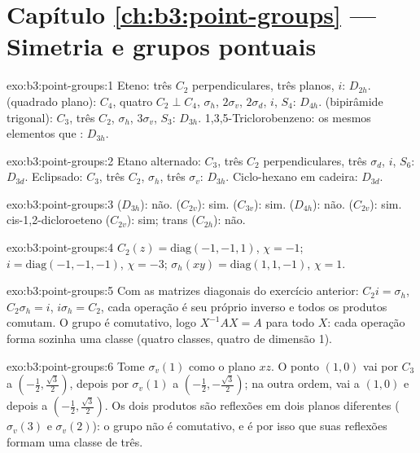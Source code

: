 \section*{Capítulo \ref{ch:b3:point-groups} --- Simetria e grupos pontuais}

\begin{solution}{exo:b3:point-groups:1}
Eteno: três $C_2$ perpendiculares, três planos, $i$: $D_{2h}$.  (quadrado
plano): $C_4$, quatro $C_2 \perp C_4$, $\sigma_h$, $2\sigma_v$, $2\sigma_d$, $i$, $S_4$:
$D_{4h}$.  (bipirâmide trigonal): $C_3$, três $C_2$, $\sigma_h$, $3\sigma_v$,
$S_3$: $D_{3h}$. 1,3,5-Triclorobenzeno: os mesmos elementos que : $D_{3h}$.
\end{solution}

\begin{solution}{exo:b3:point-groups:2}
Etano alternado: $C_3$, três $C_2$ perpendiculares, três $\sigma_d$, $i$, $S_6$:
$D_{3d}$. Eclipsado: $C_3$, três $C_2$, $\sigma_h$, três $\sigma_v$: $D_{3h}$.
Ciclo-hexano em cadeira: $D_{3d}$.
\end{solution}

\begin{solution}{exo:b3:point-groups:3}
 ($D_{3h}$): não.  ($C_{2v}$): sim.  ($C_{3v}$): sim.
 ($D_{4h}$): não.  ($C_{2v}$): sim. cis-1,2-dicloroeteno
($C_{2v}$): sim; trans ($C_{2h}$): não.
\end{solution}

\begin{solution}{exo:b3:point-groups:4}
$C_2(z) = \mathrm{diag}(-1,-1,1)$, $\chi = -1$; $i = \mathrm{diag}(-1,-1,-1)$,
$\chi = -3$; $\sigma_h(xy) = \mathrm{diag}(1,1,-1)$, $\chi = 1$.
\end{solution}

\begin{solution}{exo:b3:point-groups:5}
Com as matrizes diagonais do exercício anterior: $C_2i = \sigma_h$, $C_2\sigma_h =
i$, $i\sigma_h = C_2$, cada operação é seu próprio inverso e todos os produtos
comutam. O grupo é comutativo, logo $X^{-1}AX = A$ para todo $X$: cada
operação forma sozinha uma classe (quatro classes, quatro  de dimensão 1).
\end{solution}

\begin{solution}{exo:b3:point-groups:6}
Tome $\sigma_v(1)$ como o plano $xz$. O ponto $(1,0)$ vai por $C_3$ a $(-\frac12,
\frac{\sqrt3}2)$, depois por $\sigma_v(1)$ a $(-\frac12,-\frac{\sqrt3}2)$; na outra
ordem, vai a $(1,0)$ e depois a $(-\frac12,\frac{\sqrt3}2)$. Os dois produtos são
reflexões em dois planos diferentes ($\sigma_v(3)$ e $\sigma_v(2)$): o grupo não é
comutativo, e é por isso que suas reflexões formam uma classe de três.
\end{solution}

